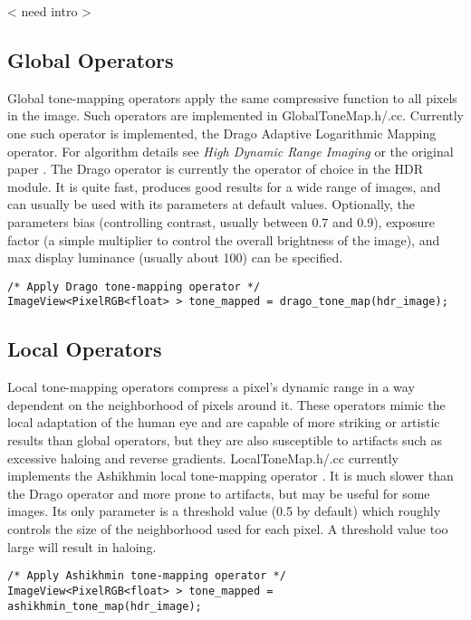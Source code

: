 < need intro >

\subsection{Global Operators}
Global tone-mapping operators apply the same compressive function to
all pixels in the image. Such operators are implemented in
GlobalToneMap.h/.cc. Currently one such operator is implemented, the
Drago Adaptive Logarithmic Mapping operator.  For algorithm details
see \emph{High Dynamic Range Imaging} \cite{hdrbook} or the original
paper \cite{drago}.  The Drago operator is currently the operator of
choice in the HDR module. It is quite fast, produces good results for
a wide range of images, and can usually be used with its parameters at
default values. Optionally, the parameters bias (controlling contrast,
usually between 0.7 and 0.9), exposure factor (a simple multiplier to
control the overall brightness of the image), and max display
luminance (usually about 100) can be specified.

\begin{verbatim}
/* Apply Drago tone-mapping operator */
ImageView<PixelRGB<float> > tone_mapped = drago_tone_map(hdr_image);
\end{verbatim}

\subsection{Local Operators}
Local tone-mapping operators compress a pixel's dynamic range in a way
dependent on the neighborhood of pixels around it. These operators
mimic the local adaptation of the human eye and are capable of more
striking or artistic results than global operators, but they are also
susceptible to artifacts such as excessive haloing and reverse
gradients. LocalToneMap.h/.cc currently implements the Ashikhmin local
tone-mapping operator \cite{ashikhmin}.  It is much slower than the
Drago operator and more prone to artifacts, but may be useful for some
images. Its only parameter is a threshold value (0.5 by default) which
roughly controls the size of the neighborhood used for each pixel. A
threshold value too large will result in haloing.

\begin{verbatim}
/* Apply Ashikhmin tone-mapping operator */
ImageView<PixelRGB<float> > tone_mapped = ashikhmin_tone_map(hdr_image);
\end{verbatim}


